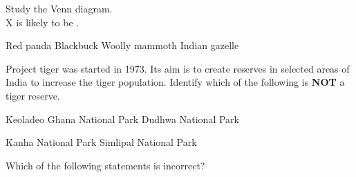 


\begin{center}
\end{center}

\begin{questions}

\question Study the Venn diagram. \\ X is likely to be \fillin . \\


\begin{randomizeoneparchoices}
    \CorrectChoice Red panda
    \choice Blackbuck
    \choice Woolly mammoth
    \choice Indian gazelle
\end{randomizeoneparchoices}

\question Project tiger was started in 1973. Its aim is to create reserves in selected areas of India to increase the tiger population. Identify which of the following is \textbf{NOT} a tiger reserve.

    \begin{choices}
        \begin{minipage}[t]{0.45\textwidth}
        \CorrectChoice Keoladeo Ghana National Park
        \choice Dudhwa National Park
    \end{minipage}
    \begin{minipage}[t]{0.45\textwidth}
        \choice Kanha National Park
        \choice Simlipal National Park
    \end{minipage}
    \end{choices}

    \question Which of the following statements is incorrect?


\end{questions}
